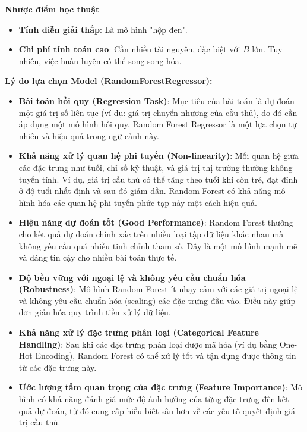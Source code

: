 \documentclass[12pt]{report}
\begin{document}
{\textbf*{Nhược điểm học thuật}
\begin{itemize}
    \item \textbf{Tính diễn giải thấp}: Là mô hình "hộp đen".
    \item \textbf{Chi phí tính toán cao}: Cần nhiều tài nguyên, đặc biệt với $B$ lớn. Tuy nhiên, việc huấn luyện có thể song song hóa.
\end{itemize}

\textbf*{Lý do lựa chọn Model (RandomForestRegressor):}
\begin{itemize}
    \item \textbf{Bài toán hồi quy (Regression Task)}: Mục tiêu của bài toán là dự đoán một giá trị số liên tục (ví dụ: giá trị chuyển nhượng của cầu thủ), do đó cần áp dụng một mô hình hồi quy. Random Forest Regressor là một lựa chọn tự nhiên và hiệu quả trong ngữ cảnh này.
    
    \item \textbf{Khả năng xử lý quan hệ phi tuyến (Non-linearity)}: Mối quan hệ giữa các đặc trưng như tuổi, chỉ số kỹ thuật, và giá trị thị trường thường không tuyến tính. Ví dụ, giá trị cầu thủ có thể tăng theo tuổi khi còn trẻ, đạt đỉnh ở độ tuổi nhất định và sau đó giảm dần. Random Forest có khả năng mô hình hóa các quan hệ phi tuyến phức tạp này một cách hiệu quả.
    
    \item \textbf{Hiệu năng dự đoán tốt (Good Performance)}: Random Forest thường cho kết quả dự đoán chính xác trên nhiều loại tập dữ liệu khác nhau mà không yêu cầu quá nhiều tinh chỉnh tham số. Đây là một mô hình mạnh mẽ và đáng tin cậy cho nhiều bài toán thực tế.
    
    \item \textbf{Độ bền vững với ngoại lệ và không yêu cầu chuẩn hóa (Robustness)}: Mô hình Random Forest ít nhạy cảm với các giá trị ngoại lệ và không yêu cầu chuẩn hóa (scaling) các đặc trưng đầu vào. Điều này giúp đơn giản hóa quy trình tiền xử lý dữ liệu.
    
    \item \textbf{Khả năng xử lý đặc trưng phân loại (Categorical Feature Handling)}: Sau khi các đặc trưng phân loại được mã hóa (ví dụ bằng One-Hot Encoding), Random Forest có thể xử lý tốt và tận dụng được thông tin từ các đặc trưng này.
    
    \item \textbf{Ước lượng tầm quan trọng của đặc trưng (Feature Importance)}: Mô hình có khả năng đánh giá mức độ ảnh hưởng của từng đặc trưng đến kết quả dự đoán, từ đó cung cấp hiểu biết sâu hơn về các yếu tố quyết định giá trị cầu thủ.
    

\end{itemize}}
\end{document}
